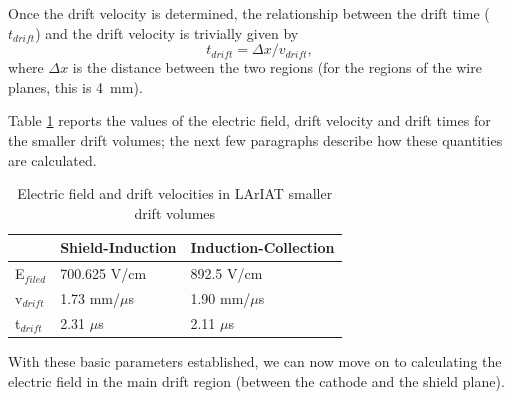 Once the drift velocity is determined, the relationship between the drift time ($t_{drift}$) and the drift velocity is trivially given by
\begin{equation}
t_{drift} = \Delta x/v_{drift}, \label{eq:drifttime}
\end{equation}
where $\Delta x$ is the distance between the two regions (for the regions of the wire planes, this is 4~mm).

Table \ref{tab:Efields} reports the values of the electric field, drift velocity and drift times for the smaller drift volumes; the next few paragraphs describe how these quantities are calculated.

 
\begin{table}[]
\centering
\caption{Electric field and drift velocities in LArIAT smaller drift volumes}
\label{tab:Efields}
\begin{tabular}{|l|l|l|}
\hline
& Shield-Induction & Induction-Collection \\ \hline
E$_{filed}$ &                 700.625 V/cm        &                892.5  V/cm             \\ \hline
v$_{drift}$ &                   1.73  mm/$\mu$s   &                  1.90 mm/$\mu$s        \\ \hline
t$_{drift}$ &                   2.31  $\mu$s      &                   2.11 $\mu$s          \\ \hline

\end{tabular}
\end{table}

With these basic parameters established, we can now move on to calculating the electric field in the main drift region (between the cathode and the shield plane).
